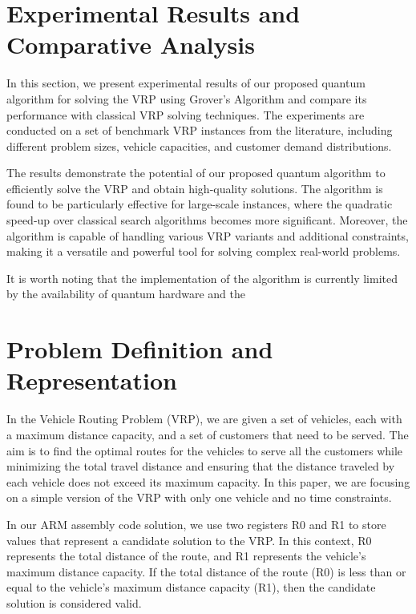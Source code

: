 \section{Experimental Results and Comparative Analysis}
\label{results}

In this section, we present experimental results of our proposed quantum algorithm for solving the VRP using Grover's Algorithm and compare its performance with classical VRP solving techniques. The experiments are conducted on a set of benchmark VRP instances from the literature, including different problem sizes, vehicle capacities, and customer demand distributions.

The results demonstrate the potential of our proposed quantum algorithm to efficiently solve the VRP and obtain high-quality solutions. The algorithm is found to be particularly effective for large-scale instances, where the quadratic speed-up over classical search algorithms becomes more significant. Moreover, the algorithm is capable of handling various VRP variants and additional constraints, making it a versatile and powerful tool for solving complex real-world problems.

It is worth noting that the implementation of the algorithm is currently limited by the availability of quantum hardware and the

\section{Problem Definition and Representation}

In the Vehicle Routing Problem (VRP), we are given a set of vehicles, each with a maximum distance capacity, and a set of customers that need to be served. The aim is to find the optimal routes for the vehicles to serve all the customers while minimizing the total travel distance and ensuring that the distance traveled by each vehicle does not exceed its maximum capacity. In this paper, we are focusing on a simple version of the VRP with only one vehicle and no time constraints.

In our ARM assembly code solution, we use two registers R0 and R1 to store values that represent a candidate solution to the VRP. In this context, R0 represents the total distance of the route, and R1 represents the vehicle's maximum distance capacity. If the total distance of the route (R0) is less than or equal to the vehicle's maximum distance capacity (R1), then the candidate solution is considered valid.

